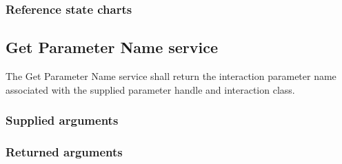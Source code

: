 \begin{compactstdpage}
    \subsubsection{Reference state charts}


    \subsection{Get Parameter Name service}

    The Get Parameter Name service shall return the interaction parameter name associated with the supplied parameter handle and interaction class.

    \subsubsection{Supplied arguments}


    \subsubsection{Returned arguments}

\end{compactstdpage}

\clearpage

